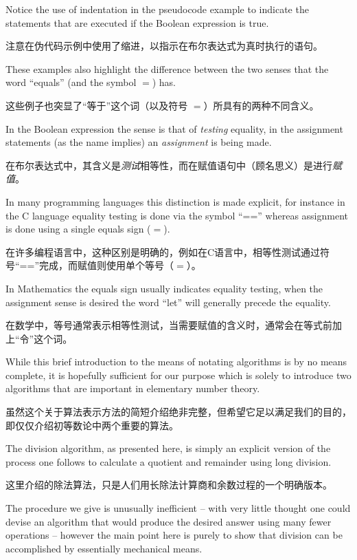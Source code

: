 Notice the use of indentation in the pseudocode example to indicate
the statements that are executed if the Boolean expression is true.

注意在伪代码示例中使用了缩进，以指示在布尔表达式为真时执行的语句。

These examples also highlight the difference between the two senses 
that the word ``equals'' (and the symbol $=$) has.

这些例子也突显了“等于”这个词（以及符号 $=$）所具有的两种不同含义。

In the Boolean
expression the sense is that of {\em testing} equality, in the
assignment statements (as the name implies) an {\em assignment} is
being made.

在布尔表达式中，其含义是{\em 测试}相等性，而在赋值语句中（顾名思义）是进行{\em 赋值}。

In many programming languages this distinction is made
explicit, for instance in the C language equality testing is done via
the symbol ``=='' whereas assignment is done using a single equals
sign ($=$).

在许多编程语言中，这种区别是明确的，例如在C语言中，相等性测试通过符号“==”完成，而赋值则使用单个等号（$=$）。

In Mathematics the equals sign usually indicates equality
testing, when the assignment sense is desired the word ``let'' will
generally precede the equality.

在数学中，等号通常表示相等性测试，当需要赋值的含义时，通常会在等式前加上“令”这个词。

While this brief introduction to the means of notating algorithms is by no
means complete, it is hopefully sufficient for our purpose which is
solely to introduce two algorithms that are important in elementary
number theory.

虽然这个关于算法表示方法的简短介绍绝非完整，但希望它足以满足我们的目的，即仅仅介绍初等数论中两个重要的算法。

The  division algorithm, 
as presented here, is simply
an explicit version of the process one follows to calculate a quotient
and remainder using long division.

这里介绍的除法算法，只是人们用长除法计算商和余数过程的一个明确版本。

The procedure we give is unusually
inefficient -- with very little thought one could devise an algorithm
that would produce the desired answer using many fewer operations --
however the main point here is purely to show that division can be
accomplished by essentially mechanical means.

